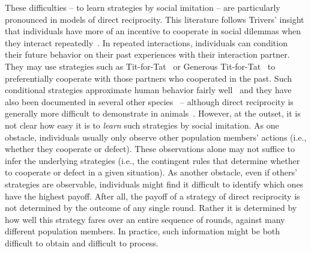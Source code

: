 \documentclass[11pt]{article}
\theoremstyle{plainCl1}
\theoremstyle{plainCl2}
\begin{document}
These difficulties -- to learn strategies by social imitation -- are particularly pronounced in models of direct reciprocity. 
This literature follows Trivers' insight that individuals have more of an incentive to cooperate in social dilemmas when they interact repeatedly~\citep{trivers1971evolution}. 
In repeated interactions, individuals can condition their future behavior on their past experiences with their interaction partner. 
They may use strategies such as Tit-for-Tat~\citep{rapoport:book:1965} or Generous Tit-for-Tat~\citep{molander:jcr:1985,Nowak1992tit} to preferentially cooperate with those partners who cooperated in the past. 
Such conditional strategies approximate human behavior fairly well~\citep{fischbacher:EconL:2001,Rand:TCS:2013,DalBo:AER:2019,Rossetti:ETH:2023} and they have also been documented in several other species~\citep{Carter:PRSB:2013,Schweinfurth:AnBehav:2019,Voelkl:PNAS:2015} -- although direct reciprocity is generally more difficult to demonstrate in animals~\citep{CluttonBrock:Nature:2009,Silk:CurrentBiology:2013,taborsky:CurrentBiology:2013}.
However, at the outset, it is not clear how easy it is to {\it learn} such strategies by social imitation. 
As one obstacle, individuals usually only observe other population members' actions (i.e., whether they cooperate or defect). 
These observations alone may not suffice to infer the underlying strategies (i.e., the contingent rules that determine whether to cooperate or defect in a given situation). 
As another obstacle, even if others' strategies are observable, individuals might find it difficult to identify which ones have the highest payoff. 
After all, the payoff of a strategy of direct reciprocity is not determined by the outcome of any single round.
Rather it is determined by how well this strategy fares over an entire sequence of rounds, against many different population members. 
In practice, such information might be both difficult to obtain and difficult to process. 

\end{document}
